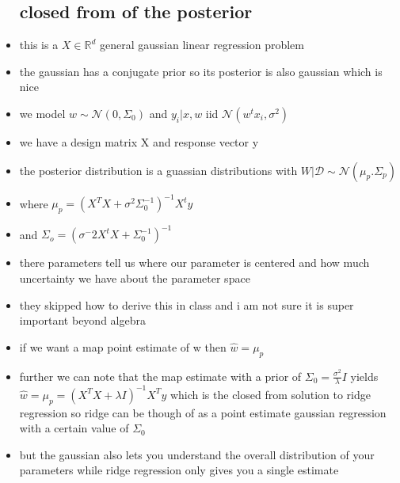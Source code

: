 \documentclass{article}
\begin{document}
\begin{itemize}
\subsection*{closed from of the posterior}
\item this is a $X\in \mathbb{R}^{d}$ general gaussian linear regression problem
\item the gaussian has a conjugate prior so its posterior is also gaussian which is nice
\item we model $w\sim \mathcal{N}(0,\Sigma_0)$ and $y_i|x,w$ iid $\mathcal{N}(w^tx_i,\sigma^2)$
\item we have a design matrix X and response vector y 
\item the posterior distribution is a guassian distributions with $W|\mathcal{D}\sim \mathcal{N}(\mu_p.\Sigma_p)$
\item where $\mu_p=(X^TX+\sigma^2\Sigma_{0}^{-1})^{-1}X^ty$
\item and $\Sigma_o=(\sigma^-2X^tX+\Sigma^{-1}_0)^{-1}$
\item there parameters tell us where our parameter is centered and how much uncertainty we have about the parameter space
\item they skipped how to derive this in class and i am not sure it is super important beyond algebra
\item if we want a map point estimate of w then $\hat{w}=\mu_p$
\item further we can note that the map estimate with a prior of $\Sigma_0=\frac{\sigma^2}{\lambda }I$ yields $\hat{w}=\mu_p=(X^TX+\lambda I)^{-1}X^Ty$ which is the closed from solution to ridge regression so ridge can be though of as a point estimate gaussian regression with a certain value of $\Sigma_0$
\item but the gaussian also lets you understand the overall distribution of your parameters while ridge regression only gives you a single estimate
\end{itemize}
\end{document}
